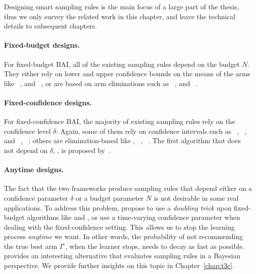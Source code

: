 Designing smart sampling rules is the main focus of a large part of the thesis, thus we only survey the related work in this chapter, and leave the technical details to subsequent chapters.

\paragraph{Fixed-budget designs.}

For fixed-budget BAI, all of the existing sampling rules depend on the budget $N$. They either rely on lower and upper confidence bounds on the means of the arms like \UCBE~\citep{audibert2010budget}, and \UGapE~\citep{gabillon2012ugape}, or are based on arm eliminations such as \SR~\citep{audibert2010budget}, and \SHA~\citep{karnin2013sha}.

\paragraph{Fixed-confidence designs.}

For fixed-confidence BAI, the majority of existing sampling rules rely on the confidence level $\delta$: Again, some of them rely on confidence intervals such as \LUCB~\citep{kalyanakrishnan2012lucb}, \UGapE~\citep{gabillon2012ugape}, \KLLUCB and \KLRacing~\citep{kaufmann2013kl}, \LIL~\citep{jamieson2014lilucb}; others are elimination-based like \SE, \ME~\citep{even-dar2003confidence}, \EGE~\citep{karnin2013sha}. The first algorithm that does not depend on $\delta$, \Track, is proposed by~\cite{garivier2016tracknstop}.

\paragraph{Anytime designs.}

The fact that the two frameworks produce sampling rules that depend either on a confidence parameter $\delta$ or a budget parameter $N$ is not desirable in some real applications. To address this problem, \cite{jun2016atlucb} propose to use a \emph{doubling trick} upon fixed-budget algorithms like \SR and \SHA, or use a time-varying confidence parameter when dealing with the fixed-confidence setting. This allows us to stop the learning process \emph{anytime} we want. In other words, the probability of not recommending the true best arm $I^\star$, when the learner stops, needs to decay as fast as possible. \cite{russo2016ttts} provides an interesting alternative that evaluates sampling rules in a Bayesian perspective. We provide further insights on this topic in Chapter~\ref{chap:t3c}. %

